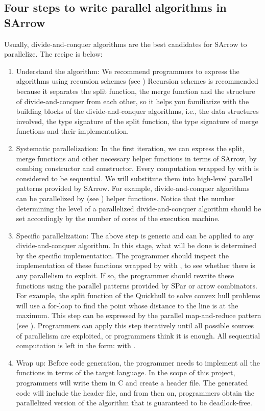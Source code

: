 \subsection{Four steps to write parallel algorithms in SArrow}
Usually, divide-and-conquer algorithms are the best candidates for SArrow to parallelize. The recipe is below:
\begin{enumerate}
    \item Understand the algorithm: We recommend programmers to express the algorithms using recursion schemes (see ) Recursion schemes is recommended because it separates the split function, the merge function and the structure of divide-and-conquer from each other, so it helps you familiarize with the building blocks of the divide-and-conquer algorithms, i.e., the data structures involved, the type signature of the split function, the type signature of merge functions and their implementation.
    \item Systematic parallelization: In the first iteration, we can express the split, merge functions and other necessary helper functions in terms of SArrow, by combing  constructor and  constructor. Every computation wrapped by  with  is considered to be sequential. We will substitute them into high-level parallel patterns provided by SArrow. For example, divide-and-conquer algorithms can be parallelized by  (see ) helper functions. Notice that the number determining the level of a parallelized divide-and-conquer algorithm should be set accordingly by the number of cores of the execution machine.
    \item Specific parallelization: The above step is generic and can be applied to any divide-and-conquer algorithm. In this stage, what will be done is determined by the specific implementation. The programmer should inspect the implementation of these functions wrapped by  with , to see whether there is any parallelism to exploit. If so, the programmer should rewrite these functions using the parallel patterns provided by SPar or arrow combinators. For example, the split function of the Quickhull \cite{Quickhull2019} to solve convex hull problems will use a for-loop to find the point whose distance to the line is at the maximum. This step can be expressed by the parallel map-and-reduce pattern (see ). Programmers can apply this step iteratively until all possible sources of parallelism are exploited, or programmers think it is enough. All sequential computation is left in the form:  with .
    \item Wrap up: Before code generation, the programmer needs to implement all the  functions in terms of the target language. In the scope of this project, programmers will write them in C and create a header file. The generated code will include the header file, and from then on, programmers obtain the parallelized version of the algorithm that is guaranteed to be deadlock-free.
\end{enumerate}
